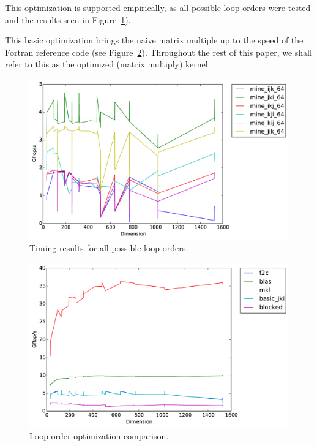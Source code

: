 \documentclass[fontsize=11pt]{scrartcl}
\numberwithin{equation}{section}        %
\numberwithin{figure}{section}          %
\numberwithin{table}{section}               %
\begin{document}
This optimization is supported empirically, as all possible loop orders were
tested and the results seen in Figure~\ref{fig:loop_order}).

This basic optimization brings the naive matrix multiple up to the speed of
the Fortran reference code (see Figure~\ref{fig:loop_jki}). Throughout the rest 
of this paper, we shall refer to this as the optimized (matrix multiply) kernel.

\begin{figure}[h]
    \centering
    \includegraphics[width=5.0in]{../final_timings/timing_loop_order.pdf}
    \caption{Timing results for all possible loop orders.}
    \label{fig:loop_order}
\end{figure}

\begin{figure}[h]
    \centering
    \includegraphics[width=5.0in]{../final_timings/timing_jki_compare.pdf}
    \caption{Loop order optimization comparison.}
    \label{fig:loop_jki}
\end{figure}
\end{document}
